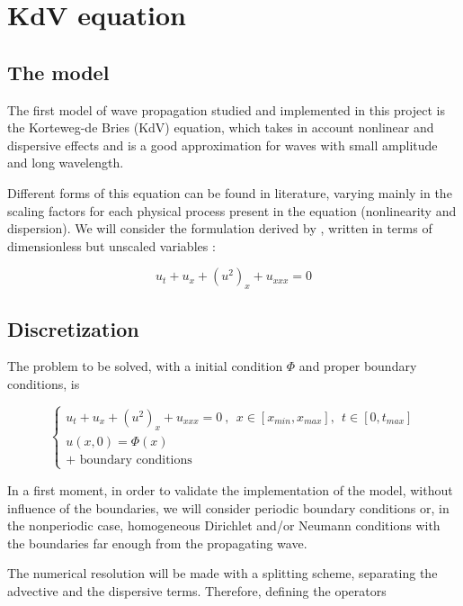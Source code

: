 \section{KdV equation}
\label{sec:KdV}

\subsection{The model}

\indent The first model of wave propagation studied and implemented in this project is the Korteweg-de Bries (KdV) equation, which takes in account  nonlinear and dispersive effects and is a good approximation for waves with small amplitude and long wavelength.

\indent Different forms of this equation can be found in literature, varying mainly in the scaling factors for each physical process present in the equation (nonlinearity and dispersion). We will consider the formulation derived by \cite{BBM1971}, written in terms of dimensionless but unscaled variables :

\begin{equation}
    u_t + u_x + (u^2)_x + u_{xxx} = 0
\end{equation}

\subsection{Discretization}

\indent The problem to be solved, with a initial condition $\Phi$ and proper boundary conditions, is

\begin{equation}
\begin{cases}
    u_t + u_x + (u^2)_x + u_{xxx} = 0 \ , \ \ x \in [x_{min},x_{max}], \ \ t \in [0, t_{max}] \\
    u(x,0) = \Phi(x) \\
    \text{+ boundary conditions}
\end{cases}
\end{equation}

\indent In a first moment, in order to validate the implementation of the model, without influence of the boundaries, we will consider periodic boundary conditions or, in the nonperiodic case, homogeneous Dirichlet and/or Neumann conditions with the boundaries far enough from the propagating wave.

\indent The numerical resolution will be made with a splitting scheme, separating the advective and the dispersive terms. Therefore, defining the operators


